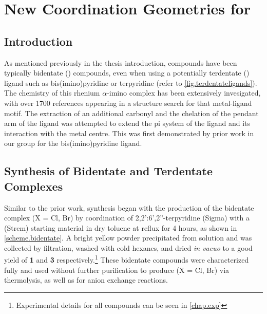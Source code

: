 \chapter{New Coordination Geometries for \texorpdfstring{}{Rhenium (I)}}
\section{Introduction}

As mentioned previously in the thesis introduction,  compounds have been typically bidentate () compounds, even when using a potentially terdentate () ligand such as bis(imino)pyridine or terpyridine (refer to \autoref{fig.terdentateligands}). The chemistry of this rhenium $\alpha$-imino complex has been extensively invesigated, with over 1700 references appearing in a structure search for that metal-ligand motif. The extraction of an additional carbonyl and the chelation of the pendant arm of the ligand was attempted to extend the pi system of the ligand and its interaction with the metal centre. This was first demonstrated by prior work in our group for the bis(imino)pyridine ligand\autocite{jurca2013}. 

\section{Synthesis of Bidentate and Terdentate \texorpdfstring{}{Rhenium (I)} Complexes}

Similar to the prior work, synthesis began with the production of the bidentate complex  (X = Cl, Br) by coordination of 2,2':6',2''-terpyridine (Sigma) with a  (Strem) starting material in dry toluene at reflux for 4 hours, as shown in \autoref{scheme.bidentate}. A bright yellow powder precipitated from solution and was collected by filtration, washed with cold hexanes, and dried \textit{in vacuo} to a good yield of \textbf{1} and \textbf{3} respectively.\footnote{Experimental details for all compounds can be seen in \autoref{chap.exp} } These bidentate compounds were characterized fully and used without further purification to produce  (X = Cl, Br) via thermolysis, as well as for anion exchange reactions. 

